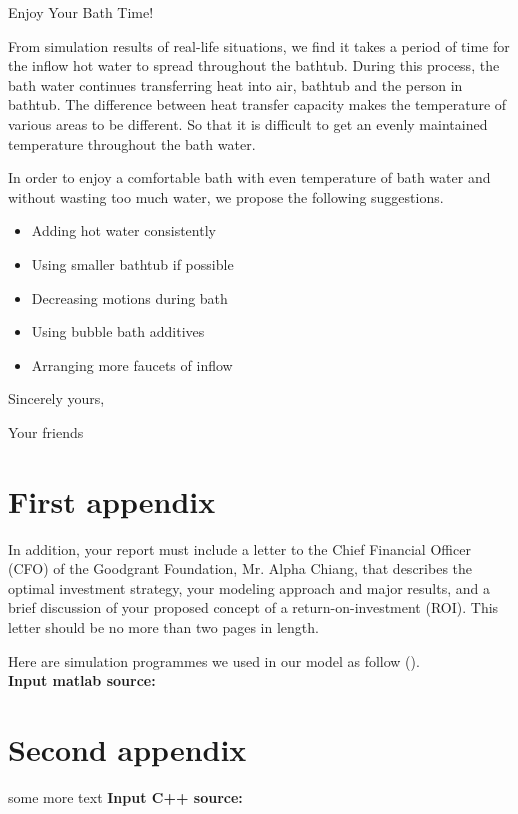 \documentclass{mcmthesis}
\begin{document}
\printbibliography

\newpage

\begin{letter}{Enjoy Your Bath Time!}

From simulation results of real-life situations, we find it takes a period of 
time for the inflow hot water to spread throughout the bathtub. During this 
process, the bath water continues transferring heat into air, bathtub and the 
person in bathtub. The difference between heat transfer capacity makes the 
temperature of various areas to be different. So that it is difficult to get 
an evenly maintained temperature throughout the bath water.

In order to enjoy a comfortable bath with even temperature of bath water and 
without wasting too much water, we propose the following suggestions.

\begin{itemize}
\item Adding hot water consistently
\item Using smaller bathtub if possible
\item Decreasing motions during bath
\item Using bubble bath additives
\item Arranging more faucets of inflow
\end{itemize}

\vspace{\parskip}

Sincerely yours,

Your friends

\end{letter}

\newpage

\begin{appendices}

\section{First appendix}

In addition, your report must include a letter to the Chief Financial Officer 
(CFO) of the Goodgrant Foundation, Mr. Alpha Chiang, that describes the optimal 
investment strategy, your modeling approach and major results, and a brief 
discussion of your proposed concept of a return-on-investment (ROI). This letter 
should be no more than two pages in length.

Here are simulation programmes we used in our model as follow (\cite{Liu02}).\\

\textbf{\textcolor[rgb]{0.98,0.00,0.00}{Input matlab source:}}


\section{Second appendix}

some more text \textcolor[rgb]{0.98,0.00,0.00}{\textbf{Input C++ source:}}


\end{appendices}
\end{document}
